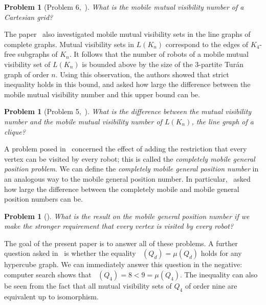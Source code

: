 \documentclass[a4paper,12pt]{article}
\DeclareMathOperator{\mobmv}{Mob_{\mu}}
\newtheorem{problem}[theorem]{Problem}
\theoremstyle{definition}
\begin{document}
	\begin{problem}[Problem 6,~\cite{dettlaff2024}]\label{prob:Cartesian grids}
		What is the mobile mutual visibility number of a Cartesian grid?
	\end{problem}
	
	The paper~\cite{dettlaff2024} also investigated mobile mutual visibility sets in the line graphs of complete graphs. Mutual visibility sets in $L(K_n)$ correspond to the edges of $K_4$-free subgraphs of $K_n$. It follows that the number of robots of a mobile mutual visibility set of $L(K_n)$ is bounded above by the size of the 3-partite Tur\'{a}n graph of order $n$. Using this observation, the authors showed that strict inequality holds in this bound, and asked how large the difference between the mobile mutual visibility number and this upper bound can be.
	
	\begin{problem}[Problem 5,~\cite{dettlaff2024}]\label{prob:LK_n}
		What is the difference between the mutual visibility number and the mobile mutual visibility number of $L(K_n)$, the line graph of a clique?
	\end{problem}
	
	A problem posed in~\cite{klavzar-2023} concerned the effect of adding the restriction that every vertex can be visited by every robot; this is called the \emph{completely mobile general position problem}. We can define the \emph{completely mobile general position number} in an analogous way to the mobile general position number. In particular,~\cite{klavzar-2023} asked how large the difference between the completely mobile and mobile general position numbers can be.
	
	\begin{problem}[\cite{klavzar-2023}]\label{prob:completely mobile}
		What is the result on the mobile general position number if we make the stronger requirement that \emph{every} vertex is visited by \emph{every} robot?
	\end{problem}
	
	The goal of the present paper is to answer all of these problems. A further question asked in~\cite{dettlaff2024} is whether the equality $\mobmv (Q_d) = \mu (Q_d)$ holds for any hypercube graph. We can immediately answer this question in the negative: computer search shows that $\mobmv (Q_4) = 8 < 9 = \mu (Q_4)$. The inequality can also be seen from the fact that all mutual visibility sets of $Q_4$ of order nine are equivalent up to isomorphism.
	
\end{document}
